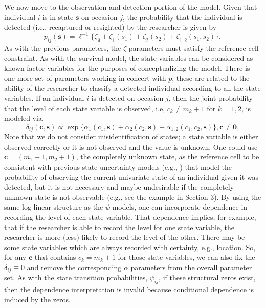 \documentclass[sts]{imsart}
\numberwithin{equation}{section}
\theoremstyle{plain}
\newcommand{\bs}{\ensuremath{\mathbf{s}}}
\newcommand{\bc}{\ensuremath{\mathbf{c}}}
\newcommand{\bzero}{\ensuremath{\mathbf{0}}}
\begin{document}
We now move to the observation and detection portion of the model. Given that individual $i$ is in state $\bs$ on occasion $j$, the probability that the individual is detected (i.e., recaptured or resighted) by the researcher is given by
\begin{equation}
p_{ij}(\bs) = \ell^{-1}\{\zeta_\emptyset + \zeta_1(s_1) + \zeta_2(s_2) + \zeta_{1,2}(s_1,s_2)\},
\end{equation}
As with the previous parameters, the $\zeta$ parameters must satisfy the reference cell constraint. As with the survival model, the state variables can be considered as known factor variables for the purposes of conceptualizing the model. There is one more set of parameters working in concert with $p$, these are related to the ability of the researcher to classify a detected individual according to all the state variables. If an individual $i$ is detected on occasion $j$, then the joint probability that the level of each state variable is observed, i.e, $c_k \ne m_k+1$ for $k=1,2$, is modeled via,
\begin{equation}
\delta_{ij}(\bc,\bs) \propto \exp\{\alpha_1(c_1,\bs) + \alpha_2(c_2,\bs) + \alpha_{1,2}(c_1,c_2,\bs)\}, \bc \ne \bzero,
\end{equation}
Note that we do not consider misidentification of states; a state variable is either observed correctly or it is not observed and the value is unknown. One could use $\bc = (m_1+1,m_2+1)$, the completely unknown state, as the reference cell to be consistent with previous state uncertainty models (e.g., \citealt{Laake:2013ab,kendall2012estimating}) that model the probability of observing the current univariate state of an individual given it was detected, but it is not necessary and maybe undesirable if the completely unknown state is not observable (e.g., see the example in Section 3). By using the same log-linear structure as the $\psi$ models, one can incorporate dependence in recording the level of each state variable. That dependence implies, for example, that if the researcher is able to record the level for one state variable, the researcher is more (less) likely to record the level of the other. There may be some state variables which are always recorded with certainty, e.g., location. So, for any $\bc$ that contains $c_k=m_k+1$ for those state variables, we can also fix the $\delta_{ij}\equiv 0$ and remove the corresponding $\alpha$ parameters from the overall parameter set. As with the state transition probabilities, $\psi_{ij}$, if these structural zeros exist, then the dependence interpretation is invalid because conditional dependence is induced by the zeros. 
\end{document}
